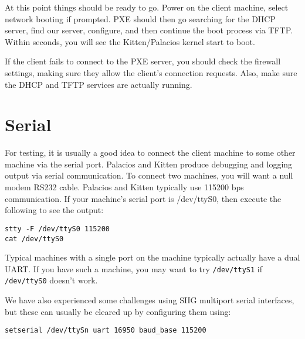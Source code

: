 \documentclass[11pt]{article}
\begin{document}
At this point things should be ready to go. Power on the client
machine, select network booting if prompted. PXE should then go
searching for the DHCP server, find our server, configure, and then
continue the boot process via TFTP.  Within seconds, you will see 
the Kitten/Palacios kernel start to boot.

If the client fails to connect to the PXE server, you should check the
firewall settings, making sure they allow the client's connection
requests.   Also, make sure the DHCP and TFTP services are actually
running. 

\section{Serial}

For testing, it is usually a good idea to connect the client machine
to some other machine via the serial port.   Palacios and Kitten
produce debugging and logging output via serial communication.   To
connect two machines, you will want a null modem RS232 cable.
Palacios and Kitten typically use 115200 bps communication.   If your
machine's serial port is /dev/ttyS0, then execute the following to see
the output:
\begin{verbatim}
stty -F /dev/ttyS0 115200
cat /dev/ttyS0
\end{verbatim}

Typical machines with a single port on the machine typically actually
have a dual UART.   If you have such a machine, you may want to try
\verb./dev/ttyS1. if \verb./dev/ttyS0. doesn't work.  

We have also experienced some challenges using SIIG multiport serial
interfaces, but these can usually be cleared up by configuring them
using:
\begin{verbatim}
setserial /dev/ttySn uart 16950 baud_base 115200
\end{verbatim}
\end{document}
